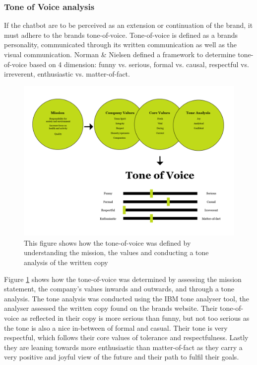         \subsubsection{Tone of Voice analysis}
    
        If the chatbot are to be perceived as an extension or continuation of the brand, it must adhere to the brands tone-of-voice. Tone-of-voice is defined as a brands personality, communicated through its written communication as well as the visual communication. Norman \& Nielsen defined a framework to determine tone-of-voice based on 4 dimension: funny vs. serious, formal vs. causal, respectful vs. irreverent, enthusiastic vs. matter-of-fact.
    
        \begin{figure}
            \centering
            \includegraphics[width=\textwidth]{figures/Tone-of-voice.png}
            \caption{This figure shows how the tone-of-voice was defined by understanding the mission, the values and conducting a tone analysis of the written copy}
            \label{fig:tov}
        \end{figure}
    
        Figure \ref{fig:tov} shows how the tone-of-voice was determined by assessing the mission statement, the company's values inwards and outwards, and through a tone analysis. The tone analysis was conducted using the IBM tone analyser tool, the analyser assessed the written copy found on the brands website. Their tone-of-voice as reflected in their copy is more serious than funny, but not too serious as the tone is also a nice in-between of formal and casual. Their tone is very respectful, which follows their core values of tolerance and respectfulness. Lastly they are leaning towards more enthusiastic than matter-of-fact as they carry a very positive and joyful view of the future and their path to fulfil their goals.

